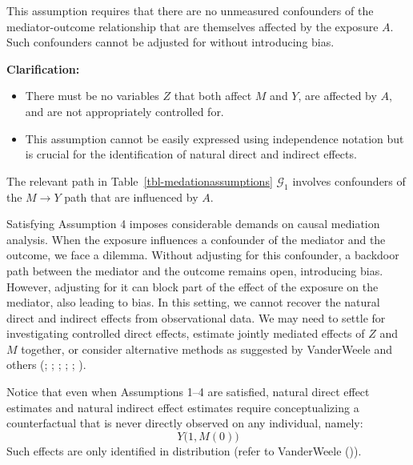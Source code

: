 \documentclass[
  single column]{article}
\providecommand{\tightlist}{%
  \setlength{\itemsep}{0pt}\setlength{\parskip}{0pt}}\usepackage{longtable,booktabs,array}
\begin{document}
\begin{enumerate}
  This assumption requires that there are no unmeasured confounders of
  the mediator-outcome relationship that are themselves affected by the
  exposure \(A\). Such confounders cannot be adjusted for without
  introducing bias.

  \textbf{Clarification:}

  \begin{itemize}
  \tightlist
  \item
    There must be no variables \(Z\) that both affect \(M\) and \(Y\),
    are affected by \(A\), and are not appropriately controlled for.
  \item
    This assumption cannot be easily expressed using independence
    notation but is crucial for the identification of natural direct and
    indirect effects.
  \end{itemize}

  The relevant path in Table~\ref{tbl-medationassumptions}
  \(\mathcal{G}_1\) involves confounders of the \(M \rightarrow Y\) path
  that are influenced by \(A\).
\end{enumerate}

Satisfying Assumption 4 imposes considerable demands on causal mediation
analysis. When the exposure influences a confounder of the mediator and
the outcome, we face a dilemma. Without adjusting for this confounder, a
backdoor path between the mediator and the outcome remains open,
introducing bias. However, adjusting for it can block part of the effect
of the exposure on the mediator, also leading to bias. In this setting,
we cannot recover the natural direct and indirect effects from
observational data. We may need to settle for investigating controlled
direct effects, estimate jointly mediated effects of \(Z\) and \(M\)
together, or consider alternative methods as suggested by VanderWeele
and others (;
;
;
;
; ).

Notice that even when Assumptions 1--4 are satisfied, natural direct
effect estimates and natural indirect effect estimates require
conceptualizing a counterfactual that is never directly observed on any
individual, namely: \[
Y\big(1, M(0)\big)
\] Such effects are only identified in distribution (refer to
VanderWeele ()).
\end{document}
